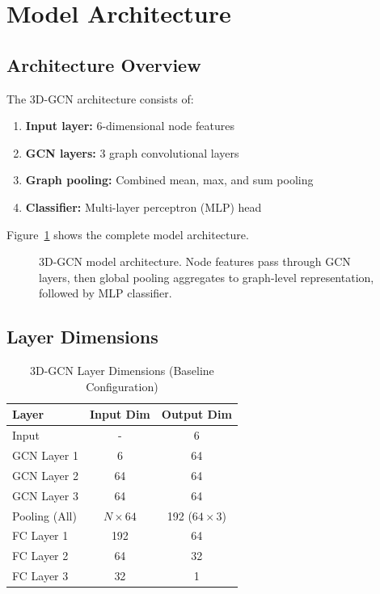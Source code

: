 \section{Model Architecture}

\subsection{Architecture Overview}

The 3D-GCN architecture consists of:

\begin{enumerate}
    \item \textbf{Input layer:} 6-dimensional node features
    \item \textbf{GCN layers:} 3 graph convolutional layers
    \item \textbf{Graph pooling:} Combined mean, max, and sum pooling
    \item \textbf{Classifier:} Multi-layer perceptron (MLP) head
\end{enumerate}

Figure~\ref{fig:gcn3d_architecture} shows the complete model architecture.

\begin{figure}[H]
    \centering
    
    \caption{3D-GCN model architecture. Node features pass through GCN layers, then global pooling aggregates to graph-level representation, followed by MLP classifier.}
    \label{fig:gcn3d_architecture}
\end{figure}

\subsection{Layer Dimensions}

\begin{table}[H]
\centering
\caption{3D-GCN Layer Dimensions (Baseline Configuration)}
\label{tab:gcn3d_layers}
\begin{tabular}{lcc}
\toprule
\textbf{Layer} & \textbf{Input Dim} & \textbf{Output Dim} \\
\midrule
Input & - & 6 \\
GCN Layer 1 & 6 & 64 \\
GCN Layer 2 & 64 & 64 \\
GCN Layer 3 & 64 & 64 \\
\midrule
Pooling (All) & $N \times 64$ & 192 ($64 \times 3$) \\
\midrule
FC Layer 1 & 192 & 64 \\
FC Layer 2 & 64 & 32 \\
FC Layer 3 & 32 & 1 \\
\bottomrule
\end{tabular}
\end{table}

